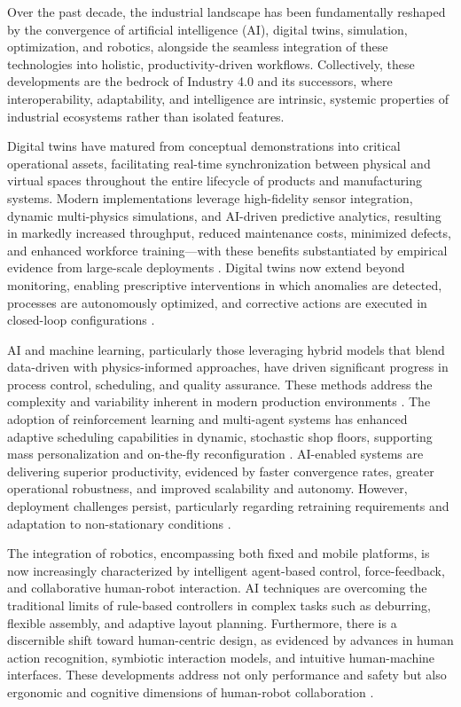 \documentclass[sigconf]{acmart}
\begin{document}
Over the past decade, the industrial landscape has been fundamentally reshaped by the convergence of artificial intelligence (AI), digital twins, simulation, optimization, and robotics, alongside the seamless integration of these technologies into holistic, productivity-driven workflows. Collectively, these developments are the bedrock of Industry 4.0 and its successors, where interoperability, adaptability, and intelligence are intrinsic, systemic properties of industrial ecosystems rather than isolated features.

Digital twins have matured from conceptual demonstrations into critical operational assets, facilitating real-time synchronization between physical and virtual spaces throughout the entire lifecycle of products and manufacturing systems. Modern implementations leverage high-fidelity sensor integration, dynamic multi-physics simulations, and AI-driven predictive analytics, resulting in markedly increased throughput, reduced maintenance costs, minimized defects, and enhanced workforce training—with these benefits substantiated by empirical evidence from large-scale deployments \cite{ref38}. Digital twins now extend beyond monitoring, enabling prescriptive interventions in which anomalies are detected, processes are autonomously optimized, and corrective actions are executed in closed-loop configurations \cite{ref41}\cite{ref43}.

AI and machine learning, particularly those leveraging hybrid models that blend data-driven with physics-informed approaches, have driven significant progress in process control, scheduling, and quality assurance. These methods address the complexity and variability inherent in modern production environments \cite{ref18}\cite{ref39}\cite{ref61}. The adoption of reinforcement learning and multi-agent systems has enhanced adaptive scheduling capabilities in dynamic, stochastic shop floors, supporting mass personalization and on-the-fly reconfiguration \cite{ref19}\cite{ref24}\cite{ref55}. AI-enabled systems are delivering superior productivity, evidenced by faster convergence rates, greater operational robustness, and improved scalability and autonomy. However, deployment challenges persist, particularly regarding retraining requirements and adaptation to non-stationary conditions \cite{ref24}\cite{ref55}.

The integration of robotics, encompassing both fixed and mobile platforms, is now increasingly characterized by intelligent agent-based control, force-feedback, and collaborative human-robot interaction. AI techniques are overcoming the traditional limits of rule-based controllers in complex tasks such as deburring, flexible assembly, and adaptive layout planning. Furthermore, there is a discernible shift toward human-centric design, as evidenced by advances in human action recognition, symbiotic interaction models, and intuitive human-machine interfaces. These developments address not only performance and safety but also ergonomic and cognitive dimensions of human-robot collaboration \cite{ref20}\cite{ref44}\cite{ref45}\cite{ref53}\cite{ref83}.
\end{document}
